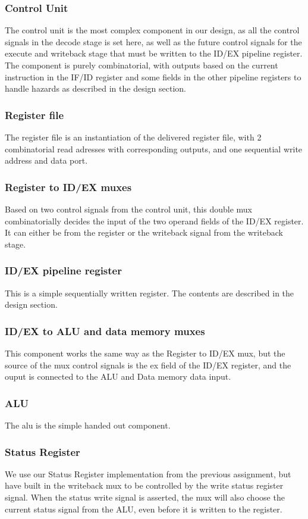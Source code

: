 \documentclass[11pt]{report}
\begin{document}
\subsubsection*{Control Unit}

The control unit is the most complex component in our design, as all the control
signals in the decode stage is set here, as well as the future control signals for
the execute and writeback stage that must be written to the ID/EX pipeline register.
The component is purely combinatorial, with outputs based on the current instruction in the
IF/ID register and some fields in the other pipeline registers to handle hazards as
described in the design section. %

\subsubsection*{Register file}
The register file is an instantiation of the delivered register file, with 
2 combinatorial read adresses with corresponding outputs, and one sequential
write address and data port.

\subsubsection*{Register to ID/EX muxes}
Based on two control signals from the control unit, this double mux combinatorially
decides the input of the two operand fields of the ID/EX register. It can 
either be from the register or the writeback signal from the writeback stage.
\subsubsection*{ID/EX pipeline register}
This is a simple sequentially written register. The contents are described in the 
design section. %
\subsubsection*{ID/EX to ALU and data memory muxes}
This component works the same way as the Register to ID/EX mux, but the source of the 
mux control signals is the ex field of the ID/EX register, and the ouput is connected
to the ALU and Data memory data input.

\subsubsection*{ALU}
The alu is the simple handed out component.
\subsubsection*{Status Register}
We use our Status Register implementation from the previous assignment, but have
built in the writeback mux to be controlled by the write status register signal.
When the status write signal is asserted, the mux will also choose the current 
status signal from the ALU, even before it is written to the register.
\end{document}
